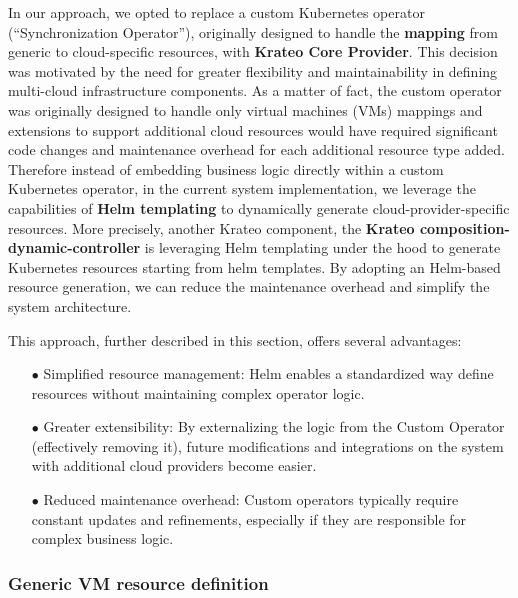 In our approach, we opted to replace a custom Kubernetes operator (``Synchronization Operator''), originally designed to handle the \textbf{mapping} from generic to cloud-specific resources, with \textbf{Krateo Core Provider}. 
This decision was motivated by the need for greater flexibility and maintainability in defining multi-cloud infrastructure components. 
As a matter of fact, the custom operator was originally designed to handle only virtual machines (VMs) mappings and extensions to support additional cloud resources would have required significant code changes and maintenance overhead for each additional resource type added.
Therefore instead of embedding business logic directly within a custom Kubernetes operator, in the current system implementation, we leverage the capabilities of \textbf{Helm templating} to dynamically generate cloud-provider-specific resources. 
More precisely, another Krateo component, the \textbf{Krateo composition-dynamic-controller} is leveraging Helm templating under the hood to generate Kubernetes resources starting from helm templates.
By adopting an Helm-based resource generation, we can reduce the maintenance overhead and simplify the system architecture.

This approach, further described in this section, offers several advantages:
\begin{itemize}[itemsep=0.2pt, topsep=1pt]
  \item[$\bullet$] Simplified resource management: Helm enables a standardized way define resources without maintaining complex operator logic.
  \item[$\bullet$] Greater extensibility: By externalizing the logic from the Custom Operator (effectively removing it), future modifications and integrations on the system with additional cloud providers become easier.
  \item[$\bullet$] Reduced maintenance overhead: Custom operators typically require constant updates and refinements, especially if they are responsible for complex business logic. 
\end{itemize}


\subsubsection{Generic VM resource definition}


